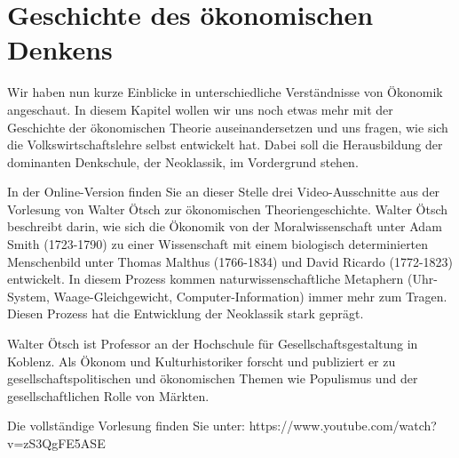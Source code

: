\documentclass[
  nswissgerman,
  a4paper,
  DIV=11,
  numbers=noendperiod,
  oneside,
  openany]{scrreprt}
\begin{document}
\section{Geschichte des ökonomischen
Denkens}\label{geschichte-des-uxf6konomischen-denkens}

Wir haben nun kurze Einblicke in unterschiedliche Verständnisse von
Ökonomik angeschaut. In diesem Kapitel wollen wir uns noch etwas mehr
mit der Geschichte der ökonomischen Theorie auseinandersetzen und uns
fragen, wie sich die Volkswirtschaftslehre selbst entwickelt hat. Dabei
soll die Herausbildung der dominanten Denkschule, der Neoklassik, im
Vordergrund stehen.

\begin{selbststudienphase}
In der Online-Version finden Sie an dieser Stelle drei Video-Ausschnitte aus der Vorlesung von Walter Ötsch zur ökonomischen Theoriengeschichte. Walter Ötsch beschreibt darin, wie sich die Ökonomik von der Moralwissenschaft unter Adam Smith (1723-1790) zu einer Wissenschaft mit einem biologisch determinierten Menschenbild unter Thomas Malthus (1766-1834) und David Ricardo (1772-1823) entwickelt. In diesem Prozess kommen naturwissenschaftliche Metaphern (Uhr-System, Waage-Gleichgewicht, Computer-Information) immer mehr zum Tragen. Diesen Prozess hat die Entwicklung der Neoklassik stark geprägt.

Walter Ötsch ist Professor an der Hochschule für Gesellschaftsgestaltung in Koblenz. Als Ökonom und Kulturhistoriker forscht und publiziert er zu gesellschaftspolitischen und ökonomischen Themen wie Populismus und der gesellschaftlichen Rolle von Märkten.

Die vollständige Vorlesung finden Sie unter: https://www.youtube.com/watch?v=zS3QgFE5ASE
\end{selbststudienphase}
\end{document}
